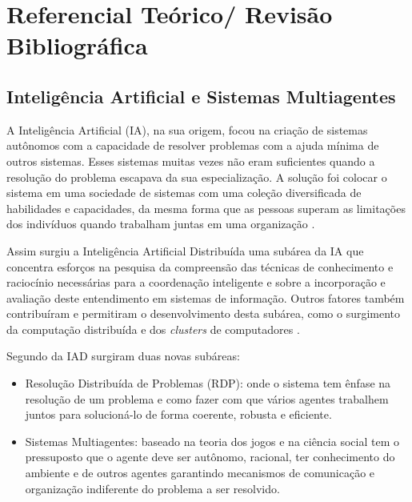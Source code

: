 \chapter{Referencial Teórico/ Revisão Bibliográfica}

\section{Inteligência Artificial e Sistemas Multiagentes}
% 
% 
% 
  A Inteligência Artificial (IA), na sua origem, focou na criação de sistemas autônomos com a capacidade de resolver problemas com a ajuda mínima de outros sistemas. Esses sistemas muitas vezes não eram suficientes quando a resolução do problema escapava da sua especialização. A solução foi colocar o sistema em uma sociedade de sistemas com uma coleção diversificada de habilidades e capacidades, da mesma forma que as pessoas superam as limitações dos indivíduos quando trabalham juntas em uma organização \cite{durfee1991distributed}. 

Assim surgiu a Inteligência Artificial Distribuída uma subárea da IA que concentra esforços na pesquisa da compreensão das técnicas de conhecimento e raciocínio necessárias para a coordenação inteligente e sobre a incorporação e avaliação deste entendimento em sistemas de informação. Outros fatores também contribuíram e permitiram o desenvolvimento desta subárea, como o surgimento da computação distribuída e dos \textit{clusters} de computadores \cite{durfee1991distributed,bond2014readings}.

Segundo \cite{durfee1994distributed} da IAD surgiram duas novas subáreas:

\begin{itemize}
\item Resolução Distribuída de Problemas (RDP): onde o sistema tem ênfase na resolução de um problema e como fazer com que vários agentes trabalhem juntos para solucioná-lo de forma coerente, robusta e eficiente.

\item Sistemas Multiagentes: baseado na teoria dos jogos e na ciência social tem o pressuposto que o agente deve ser autônomo, racional, ter conhecimento do ambiente e de outros agentes garantindo mecanismos de comunicação e organização indiferente do problema a ser resolvido.
\end{itemize}

